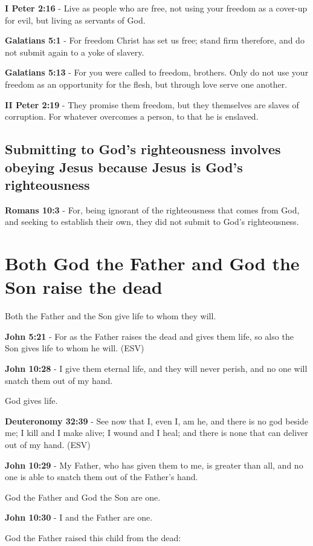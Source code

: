 \documentclass[11pt]{article}
\begin{document}
\textbf{I Peter 2:16} - Live as people who are free, not using your freedom as a cover-up for evil, but living as servants of God.

\textbf{Galatians 5:1} - For freedom Christ has set us free; stand firm therefore, and do not submit again to a yoke of slavery.

\textbf{Galatians 5:13} - For you were called to freedom, brothers. Only do not use your freedom as an opportunity for the flesh, but through love serve one another.

\textbf{II Peter 2:19} - They promise them freedom, but they themselves are slaves of corruption. For whatever overcomes a person, to that he is enslaved.

\subsection{Submitting to God's righteousness involves obeying Jesus because Jesus is God's righteousness}
\label{sec:org229c601}

\textbf{Romans 10:3} - For, being ignorant of the righteousness that comes from God, and seeking to establish their own, they did not submit to God's righteousness.

\section{Both God the Father and God the Son raise the dead}
\label{sec:org9e63c0a}
Both the Father and the Son give life to whom they will.

\textbf{John 5:21} - For as the Father raises the dead and gives them life, so also the Son gives life to whom he will. (ESV)

\textbf{John 10:28} - I give them eternal life, and they will never perish, and no one will snatch them out of my hand.

God gives life.

\textbf{Deuteronomy 32:39} - See now that I, even I, am he, and there is no god beside me; I kill and I make alive; I wound and I heal; and there is none that can deliver out of my hand. (ESV)

\textbf{John 10:29} - My Father, who has given them to me, is greater than all, and no one is able to snatch them out of the Father's hand.

God the Father and God the Son are one.

\textbf{John 10:30} - I and the Father are one.

God the Father raised this child from the dead:
\end{document}
